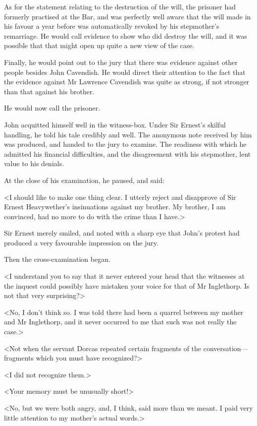  As for the statement relating to the destruction of the will, the prisoner had formerly practised at the Bar, and was perfectly well aware that the will made in his favour a year before was automatically revoked by his stepmother's remarriage. He would call evidence to show who did destroy the will, and it was possible that that might open up quite a new view of the case. 

 Finally, he would point out to the jury that there was evidence against other people besides John Cavendish. He would direct their attention to the fact that the evidence against Mr Lawrence Cavendish was quite as strong, if not stronger than that against his brother. 

 He would now call the prisoner. 

 John acquitted himself well in the witness-box. Under Sir Ernest's skilful handling, he told his tale credibly and well. The anonymous note received by him was produced, and handed to the jury to examine. The readiness with which he admitted his financial difficulties, and the disagreement with his stepmother, lent value to his denials. 

 At the close of his examination, he paused, and said: 

 <I should like to make one thing clear. I utterly reject and disapprove of Sir Ernest Heavywether's insinuations against my brother. My brother, I am convinced, had no more to do with the crime than I have.> 

 Sir Ernest merely smiled, and noted with a sharp eye that John's protest had produced a very favourable impression on the jury. 

 Then the cross-examination began. 

 <I understand you to say that it never entered your head that the witnesses at the inquest could possibly have mistaken your voice for that of Mr Inglethorp. Is not that very surprising?> 

 <No, I don't think so. I was told there had been a quarrel between my mother and Mr Inglethorp, and it never occurred to me that such was not really the case.> 

 <Not when the servant Dorcas repeated certain fragments of the conversation—fragments which you must have recognized?> 

 <I did not recognize them.> 

 <Your memory must be unusually short!> 

 <No, but we were both angry, and, I think, said more than we meant. I paid very little attention to my mother's actual words.> 

